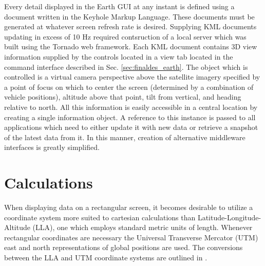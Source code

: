 
Every detail displayed in the Earth GUI at any instant is defined using a document written in the Keyhole Markup Language. These documents must be generated at whatever screen refresh rate is desired. Supplying KML documents updating in excess of 10 Hz required contsruction of a local server which was built using the Tornado web framework. Each KML document contains 3D view information supplied by the controls located in a view tab located in the command interface described in Sec. \ref{sec:finaldes_earth}. The object which is controlled is a virtual camera perspective above the satellite imagery specified by a point of focus on which to center the screen (determined by a combination of vehicle positions), altitude above that point, tilt from vertical, and heading relative to north.
All this information is easily accessible in a central location by creating a single information object. A reference to this instance is passed to all applications which need to either update it with new data or retrieve a snapshot of the latest data from it. In this manner, creation of alternative middleware interfaces is greatly simplified.


\section{Calculations} \label{sec:guicalc}

When displaying data on a rectangular screen, it becomes desirable to utilize a coordinate system more suited to cartesian calculations than Latitude-Longitude-Altitude (LLA), one which employs standard metric units of length. Whenever rectangular coordinates are necessary the Universal Transverse Mercator (UTM) east and north representations of global positions are used. The conversions between the LLA and UTM coordinate systems are outlined in \cite{projections}.

